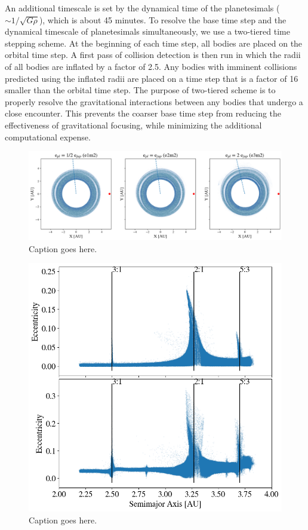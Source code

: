 \documentclass[onecolumn]{aastex63}
\begin{document}
An additional timescale is set by the dynamical time of the planetesimals ($\sim 1/\sqrt{G \rho}$), which is about 45 minutes. To 
resolve the base time step and the dynamical timescale of planetesimals simultaneously, we use a two-tiered time stepping scheme. 
At the beginning of each time step, all bodies are placed on the orbital time step. A first pass of collision detection is then run in 
which the radii of all bodies are inflated by a factor of 2.5. Any bodies with imminent collisions predicted using the inflated radii are 
placed on a time step that is a factor of 16 smaller than the orbital time step. The purpose of two-tiered scheme is to properly resolve 
the gravitational interactions between any bodies that undergo a close encounter. This prevents the coarser base time step from 
reducing the effectiveness of gravitational focusing, while minimizing the additional computational expense.

\begin{figure}
    \includegraphics[width=\textwidth]{figures/xy.png}
    \caption{Caption goes here.\label{fig:xy}}
\end{figure}

\begin{figure}
    \begin{center}
    \includegraphics[width=0.4\columnwidth]{figures/ae.png}
    \caption{Caption goes here.\label{fig:ae}}
    \end{center}
\end{figure}
\end{document}
